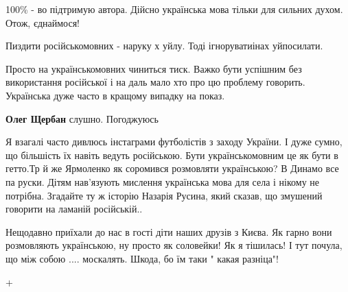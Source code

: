 \begin{itemize}
100\% - во підтримую автора. Дійсно українська мова тільки для сильних духом. Отож, єднаймося!

Пиздити російськомовних - наруку х уйлу. Тоді ігноруватиінах уйпосилати.


Просто на українськомовних чиниться тиск. Важко бути успішним без використання
російської і на даль мало хто про цю проблему говорить. Українська дуже часто в
кращому випадку на показ.

\begin{itemize} %
\textbf{Олег Щербан} слушно. Погоджуюсь
\end{itemize} %


Я взагалі часто дивлюсь інстаграми футболістів з заходу України. І дуже сумно,
що більшість їх навіть ведуть російською. Бути українськомовним це як бути в
гетто.Тр й же Ярмоленко як соромився розмовляти українською? В Динамо все па
руски. Дітям нав'язують мислення українська мова для села і нікому не потрібна.
Згадайте ту ж історію Назарія Русина, який сказав, що змушений говорити на
ламаній російській..


Нещодавно приїхали до нас в гості діти наших друзів з Києва. Як гарно вони
розмовляють українською, ну просто як соловейки! Як я тішилась! І тут почула,
що між собою .... москалять. Шкода, бо їм таки " какая разніца"!

+


\end{itemize} %
